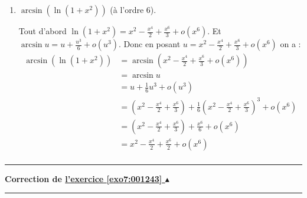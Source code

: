 \documentclass[11pt,a4paper]{article}
\newcounter{exo}
\newcommand{\correction}[1]{\hypertarget{cor7:#1}{}\label{cor7:#1}{\bf Correction de \hyperlink{exo7:#1}{l'exercice \ref{exo7:#1} $\blacktriangle$}}\vspace{1mm}\hrule\vspace{1mm}}
\newcommand{\fincorrection}{\vspace{1mm}\hrule\vspace*{7mm}}
\begin{document}
\begin{enumerate}
  \item $\arcsin \left ( \ln(1+x^2) \right )$ (à l'ordre $6$).

Tout d'abord $\ln(1+x^2)=x^2-\frac{x^4}{2}+\frac{x^6}{3}+o(x^6)$.
Et $\arcsin u =  u + \frac{u^3}{6} + o(u^3)$.
Donc en posant $u=x^2-\frac{x^4}{2}+\frac{x^6}{3}+o(x^6)$ on a :
\begin{align*}
\arcsin \left ( \ln(1+x^2) \right ) 
  & =  \arcsin \left ( x^2-\frac{x^4}{2}+\frac{x^6}{3}+o(x^6) \right )  \\
  & = \arcsin u \\
  & = u + \frac{1}{6}u^3 + o(u^3) \\
  & = \left ( x^2-\frac{x^4}{2}+\frac{x^6}{3} \right ) + \frac{1}{6}\left (x^2-\frac{x^4}{2}+\frac{x^6}{3} \right )^3 + o(x^6) \\
  & = \left ( x^2-\frac{x^4}{2}+\frac{x^6}{3}\right ) + \frac{x^6}{6} + o(x^6) \\
  & = x^2-\frac{x^4}{2}+\frac{x^6}{2}+o(x^6) \\
\end{align*}


\end{enumerate}
\fincorrection
\correction{001243}
\end{document}
